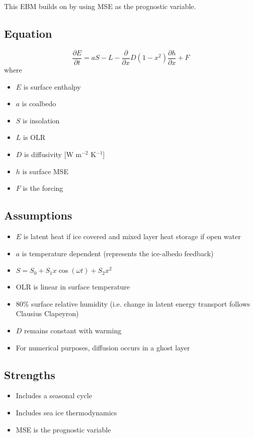\documentclass{article}
\begin{document}
\section{\cite{feldl2021}}
This EBM builds on \cite{wagner2015} by using MSE as the prognostic variable.
\subsection{Equation}
\begin{equation}
    \frac{\partial E}{\partial t} = aS - L - \frac{\partial}{\partial x}D(1-x^2)\frac{\partial h}{\partial x} + F
\end{equation}
where
\begin{itemize}
    \item $E$ is surface enthalpy
    \item $a$ is coalbedo
    \item $S$ is insolation
    \item $L$ is OLR
    \item $D$ is diffusivity [W m$^{-2}$ K$^{-1}$]
    \item $h$ is surface MSE
    \item $F$ is the forcing
\end{itemize}

\subsection{Assumptions}
\begin{itemize}
    \item $E$ is latent heat if ice covered and mixed layer heat storage if open water
    \item $a$ is temperature dependent (represents the ice-albedo feedback)
    \item $S = S_0 + S_1x\cos(\omega t) + S_2x^2$
    \item OLR is linear in surface temperature
    \item 80\% surface relative humidity (i.e. change in latent energy transport follows Clausius Clapeyron)
    \item $D$ remains constant with warming
    \item For numerical purposes, diffusion occurs in a ghost layer
\end{itemize}

\subsection{Strengths}
\begin{itemize}
    \item Includes a seasonal cycle
    \item Includes sea ice thermodynamics
    \item MSE is the prognostic variable
\end{itemize}
\end{document}
